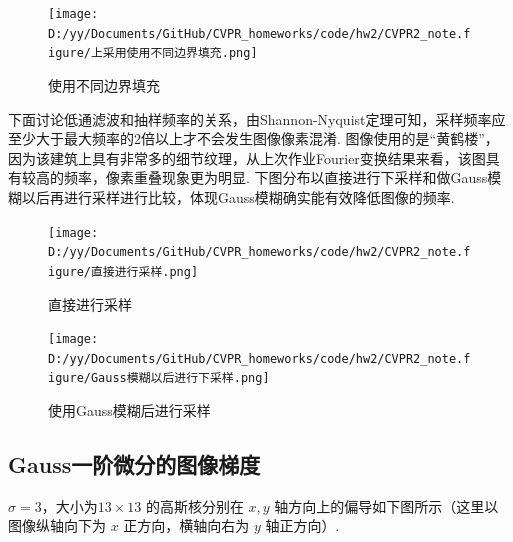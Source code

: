 \documentclass[12pt, a4paper, oneside]{ctexart}
\numberwithin{equation}{section}  %
\begin{document}
\begin{figure}[htbp]
    \centering
    \hspace*{-1cm}
    \texttt{[image: D:/yy/Documents/GitHub/CVPR\_homeworks/code/hw2/CVPR2\_note.figure/上采用使用不同边界填充.png]}
    \caption{使用不同边界填充\label{fig-3}}
\end{figure}

\begin{figure}[htbp]
    \centering
\end{figure}

下面讨论低通滤波和抽样频率的关系，由Shannon-Nyquist定理可知，采样频率应至少大于最大频率的2倍以上才不会发生图像像素混淆.
图像使用的是“黄鹤楼”，因为该建筑上具有非常多的细节纹理，从上次作业Fourier变换结果来看，该图具有较高的频率，像素重叠现象更为明显.
下图分布以直接进行下采样和做Gauss模糊以后再进行采样进行比较，体现Gauss模糊确实能有效降低图像的频率.

\begin{figure}[htbp]
    \centering
    \hspace*{-1.5cm}
    \texttt{[image: D:/yy/Documents/GitHub/CVPR\_homeworks/code/hw2/CVPR2\_note.figure/直接进行采样.png]}
    \caption{直接进行采样\label{fig-4}}
\end{figure}

\begin{figure}[htbp]
    \centering
    \hspace*{-1.5cm}
    \texttt{[image: D:/yy/Documents/GitHub/CVPR\_homeworks/code/hw2/CVPR2\_note.figure/Gauss模糊以后进行下采样.png]}
    \caption{使用Gauss模糊后进行采样\label{fig-5}}
\end{figure}

\clearpage
\subsection{Gauss一阶微分的图像梯度}
\(\sigma = 3\)，大小为\(13\times 13\) 的高斯核分别在 \(x,y\)
轴方向上的偏导如下图所示（这里以图像纵轴向下为 \(x\) 正方向，横轴向右为
\(y\) 轴正方向）.
\end{document}
